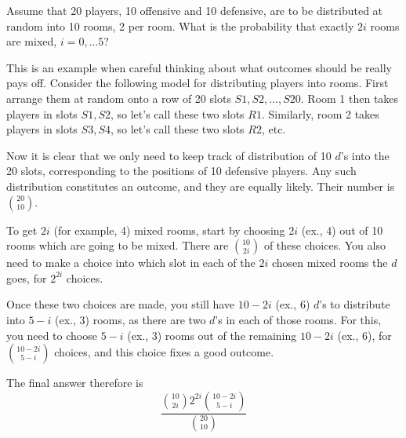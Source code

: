   Assume that 20 players, 10 offensive and 10 defensive, are 
  to be distributed at random into 10 rooms, 2 per room. What 
  is the probability that exactly $2i$ rooms are mixed, $i=0,\dots 5$? 

  This is an example when careful thinking about what outcomes 
  should be really pays off. Consider the following 
  model for distributing players into rooms. First 
  arrange them at random onto a row of 20 slots $S1,S2,\dots, S20$. Room 1
  then takes players in slots $S1,S2$, so let's call these two slots $R1$.
  Similarly, room 2 takes players in slots 
  $S3, S4$, so let's call these two slots $R2$, etc. 

  Now it is clear that we only need to keep track of distribution 
  of 10 $d$'s into the 20 slots, corresponding to the positions of 10
  defensive players. Any such distribution constitutes an outcome, 
  and they are equally likely. Their number is ${{20}\choose {10}}$. 

  To get $2i$ (for example, 4) mixed rooms, start by choosing 
  $2i$ (ex., 4) out of 10 rooms which are going to be mixed. 
  There are  ${{10}\choose {2i}}$ of these choices. You also 
  need to make a choice into which slot in each of the 
  $2i$ chosen mixed rooms the $d$ goes, for $2^{2i}$ choices. 

  Once these two choices 
  are made, you still have $10-2i$ (ex., 6) $d$'s to distribute into 
  $5-i$ (ex., 3) rooms, as there are two $d$'s in each of those rooms. 
  For this, you need to choose $5-i$ (ex., 3) rooms out of 
  the remaining $10-2i$ (ex.,  6), for ${{10-2i}\choose {5-i}}$
  choices, and this choice fixes a good outcome. 

  The final answer therefore 
  is 
  $$
  \frac{ {{10}\choose {2i}} 2^{2i} {{10-2i}\choose {5-i}} }{ {{20}\choose {10}} }
  $$

